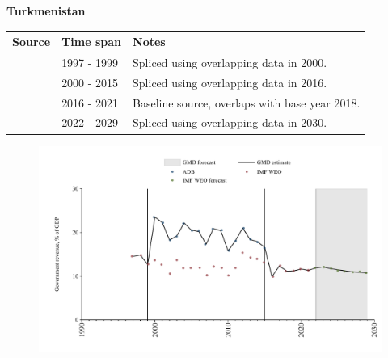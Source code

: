 \documentclass[12pt,a4paper,landscape]{article}
\begin{document}
\begin{adjustbox}{max totalsize={\paperwidth}{\paperheight},center}
\begin{minipage}[t][\textheight][t]{\textwidth}
\vspace*{0.5cm}
{}
\begin{center}
{\Large\bfseries Turkmenistan}
\end{center}
\vspace{0.5cm}
\begin{table}[H]
\centering
\small
\begin{tabular}{|l|l|l|}
\hline
\textbf{Source} & \textbf{Time span} & \textbf{Notes} \\
\hline
\rowcolor{white}\cite{IMF_WEO}& 1997 - 1999 &Spliced using overlapping data in 2000.\\
\rowcolor{lightgray}\cite{ADB}& 2000 - 2015 &Spliced using overlapping data in 2016.\\
\rowcolor{white}\cite{IMF_WEO}& 2016 - 2021 &Baseline source, overlaps with base year 2018.\\
\rowcolor{lightgray}\cite{IMF_WEO_forecast}& 2022 - 2029 &Spliced using overlapping data in 2030.\\
\hline
\end{tabular}
\end{table}
\begin{figure}[H]
\centering
\includegraphics[width=\textwidth,height=0.6\textheight,keepaspectratio]{graphs/TKM_govrev_GDP.pdf}
\end{figure}
\end{minipage}
\end{adjustbox}
\end{document}
